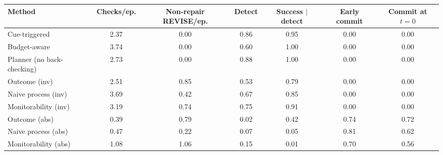 \begin{tabular}{lcccccc}
\toprule
Method & Checks/ep. & Non-repair REVISE/ep. & Detect & Success $\mid$ detect & Early commit & Commit at $t{=}0$ \\
\midrule
Cue-triggered & 2.37 & 0.00 & 0.86 & 0.95 & 0.00 & 0.00 \\
Budget-aware & 3.74 & 0.00 & 0.60 & 1.00 & 0.00 & 0.00 \\
Planner (no back-checking) & 2.73 & 0.00 & 0.88 & 1.00 & 0.00 & 0.00 \\
Outcome (inv) & 2.51 & 0.85 & 0.53 & 0.79 & 0.00 & 0.00 \\
Naive process (inv) & 3.69 & 0.42 & 0.67 & 0.85 & 0.00 & 0.00 \\
Monitorability (inv) & 3.19 & 0.74 & 0.75 & 0.91 & 0.00 & 0.00 \\
Outcome (abs) & 0.39 & 0.79 & 0.02 & 0.42 & 0.74 & 0.72 \\
Naive process (abs) & 0.47 & 0.22 & 0.07 & 0.05 & 0.81 & 0.62 \\
Monitorability (abs) & 1.08 & 1.06 & 0.15 & 0.01 & 0.70 & 0.56 \\
\bottomrule
\end{tabular}
